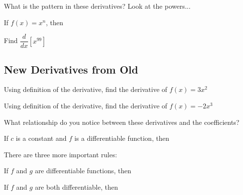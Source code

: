 \documentclass[notes]{subfiles}
\begin{document}
		\begin{question}
			What is the pattern in these derivatives? Look at the powers...
		\end{question}
			
		\begin{thm}
			If \(f(x) = x^n\), then 
			
				\vspace{.25in}
			
		\end{thm}
			
		\begin{ex}
			Find \(\dfrac{d}{dx}[x^{99}]\)
		\end{ex}

	\subsection*{New Derivatives from Old}
		\begin{ex}
			Using definition of the derivative, find the derivative of \(f(x) = 3x^2\)
		\end{ex}
			\newpage
			
		\begin{ex}
			Using definition of the derivative, find the derivative of \(f(x) = -2x^3\)
		\end{ex}
			
		\begin{question}
			What relationship do you notice between these derivatives and the coefficients?
		\end{question}
			
		\begin{thm}
			If \(c\) is a constant and \(f\) is a differentiable function, then\\[25pt]
			
		\end{thm}
			
		There are three more important rules:
		\begin{thm}
			If \(f\) and \(g\) are differentiable functions, then\\[25pt]
			
		\end{thm}
	
			\newpage
			
		\begin{thm}
			If \(f\) and \(g\) are both differentiable, then\\[75pt]
			
		\end{thm}
			
\end{document}
